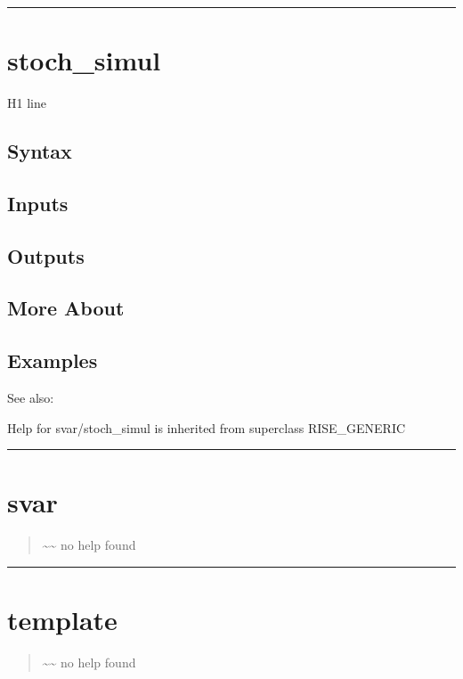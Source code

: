 \documentclass[letterpaper,10pt,english]{sphinxmanual}
\begin{document}
\bigskip\hrule{}\bigskip



\section{stoch\_simul}
\label{classes/models/@svar/svar:stoch-simul}\label{classes/models/@svar/svar:id151}
H1 line


\subsection{Syntax}
\label{classes/models/@svar/svar:id152}

\subsection{Inputs}
\label{classes/models/@svar/svar:id153}

\subsection{Outputs}
\label{classes/models/@svar/svar:id154}

\subsection{More About}
\label{classes/models/@svar/svar:id155}

\subsection{Examples}
\label{classes/models/@svar/svar:id156}
See also:

Help for svar/stoch\_simul is inherited from superclass RISE\_GENERIC


\bigskip\hrule{}\bigskip



\section{svar}
\label{classes/models/@svar/svar:id157}\label{classes/models/@svar/svar:svar}\begin{quote}

\textasciitilde{}\textasciitilde{} no help found
\end{quote}


\bigskip\hrule{}\bigskip



\section{template}
\label{classes/models/@svar/svar:id158}\label{classes/models/@svar/svar:template}\begin{quote}

\textasciitilde{}\textasciitilde{} no help found
\end{quote}
\end{document}
